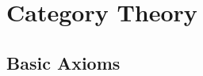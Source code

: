 \documentclass[a4paper,sfsidenotes,openany]{tufte-book}
\theoremstyle{theorem}
\begin{document}
\newpage

\chapter{Category Theory}
\begin{fullwidth}
\section{Basic Axioms}

\end{fullwidth}

\newpage

\printindex
\end{document}
